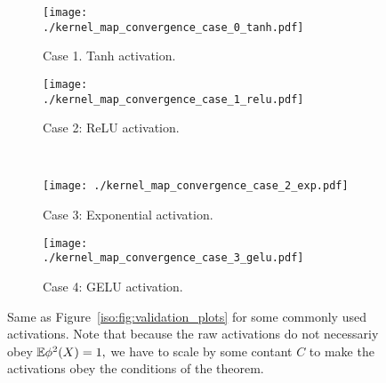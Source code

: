 \begin{figure}[ht!]
    \centering
    \begin{subfigure}[b]{0.7\textwidth}
        \centering
        \texttt{[image: ./kernel\_map\_convergence\_case\_0\_tanh.pdf]}
        \caption{\small Case 1. Tanh activation.}
    \end{subfigure}
    \hfill
    \begin{subfigure}[b]{0.7\textwidth}
        \centering
        \texttt{[image: ./kernel\_map\_convergence\_case\_1\_relu.pdf]}
        \caption{\small Case 2: ReLU activation.}
    \end{subfigure}
    \\
    \begin{subfigure}[b]{0.7\textwidth}
        \centering
        \texttt{[image: ./kernel\_map\_convergence\_case\_2\_exp.pdf]}
        \caption{\small Case 3: Exponential activation.} 
    \end{subfigure}
    \hfill
    \begin{subfigure}[b]{0.7\textwidth}
        \centering
        \texttt{[image: ./kernel\_map\_convergence\_case\_3\_gelu.pdf]}
        \caption{\small Case 4: GELU activation.}
    \end{subfigure}
    \caption{\small Same as Figure~\ref{iso:fig:validation_plots} for some commonly used activations. Note that because the raw activations do not necessariy obey $\mathbb{E} \phi^2(X)=1,$ we have to scale by some contant $C$ to make the activations obey the conditions of the theorem.}
    \label{iso:fig:validation_plots_real_activations}
\end{figure}





